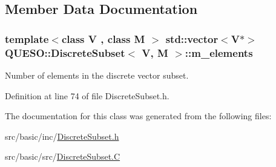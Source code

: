 \subsection{Member Data Documentation}
\hypertarget{class_q_u_e_s_o_1_1_discrete_subset_a6ef373d25c4813c2eb85b3b2ee50e705}{
\subsubsection[{m\-\_\-elements}]{\setlength{\rightskip}{0pt plus 5cm}template$<$class V , class M $>$ std\-::vector$<$V$\ast$$>$ {\bf Q\-U\-E\-S\-O\-::\-Discrete\-Subset}$<$ V, M $>$\-::m\-\_\-elements\hspace{0.3cm}{\ttfamily [protected]}}}\label{class_q_u_e_s_o_1_1_discrete_subset_a6ef373d25c4813c2eb85b3b2ee50e705}


Number of elements in the discrete vector subset. 



Definition at line 74 of file Discrete\-Subset.\-h.



The documentation for this class was generated from the following files\-:\begin{DoxyCompactItemize}
\item 
src/basic/inc/\hyperlink{_discrete_subset_8h}{Discrete\-Subset.\-h}\item 
src/basic/src/\hyperlink{_discrete_subset_8_c}{Discrete\-Subset.\-C}\end{DoxyCompactItemize}
